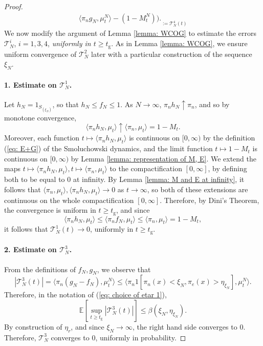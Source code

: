 \documentclass[11pt, notitlepage]{article}
\begin{document}
\begin{proof}
\begin{equation}
\begin{split}
{   \langle \pi_n g_N, \mu^N_t\rangle - (1-M^N_t)).}_{:=\mathcal{T}^4_N(t)}\end{split} \end{equation} We now modify the argument of Lemma \ref{lemma: WCOG} to estimate the errors $\mathcal{T}^i_N$, $i=1,3,4$, \emph{uniformly in $t\ge t_\mathrm{g}$}.  As in Lemma \ref{lemma: WCOG}, we ensure uniform convergence of $\mathcal{T}^2_N$ later with a particular construction of the sequence $\xi_N$. \paragraph{1. Estimate on $\mathcal{T}^1_N$.} Let $h_N=1_{S_{(\xi_N)}}$, so that $h_N \le f_N \le 1$. As $N\rightarrow \infty$, $\pi_n h_N \uparrow \pi_n$, and so by monotone convergence, \begin{equation}
       \langle \pi_n h_N, \mu_t\rangle \uparrow \langle \pi_n, \mu_t\rangle =1-M_t.
   \end{equation} Moreover, each function $t\mapsto \langle \pi_n h_N, \mu_t\rangle$ is continuous on $[0,\infty)$ by the definition (\ref{eq: E+G}) of the Smoluchowski dynamics, and the limit function $t\mapsto 1-M_t$ is continuous on $[0,\infty)$ by Lemma \ref{lemma: representation of M, E}.  We extend the maps $t\mapsto \langle \pi_n h_N, \mu_t\rangle, t\mapsto \langle \pi_n, \mu_t\rangle$ to the compactification $[0,\infty]$, by defining both to be equal to $0$ at infinity. By Lemma \ref{lemma: M and E at infinity}, it follows that $\langle \pi_n, \mu_t\rangle, \langle \pi_n h_N, \mu_t\rangle \rightarrow 0$ as $t\rightarrow \infty$, so both of these extensions are continuous on the whole compactification $[0,\infty].$  Therefore, by Dini's Theorem, the convergence is uniform in $t\geq t_\mathrm{g}$, and since \begin{equation}
       \langle \pi_n h_N, \mu_t\rangle \le \langle \pi_n f_N, \mu_t \rangle \le \langle \pi_n, \mu_t\rangle = 1-M_t, 
   \end{equation} it follows that $\mathcal{T}^1_N(t) \rightarrow 0$, uniformly in $t\geq t_\mathrm{g}$.
   \paragraph{2. Estimate on $\mathcal{T}^3_N$.} From the definitions of $f_N, g_N$, we observe that \begin{equation}
       |\mathcal{T}^3_N(t)|=\langle \pi_n(g_N-f_N), \mu^N_t\rangle \le  \langle \pi_n 1[\pi_n(x)<\xi_N, \pi_e(x)>\eta_{\xi_N}], \mu^N_t\rangle.
   \end{equation} Therefore, in the notation of (\ref{eq: choice of etar 1}), \begin{equation}
       \mathbb{E}\left[\sup_{t\geq t_\mathrm{g}} |\mathcal{T}^3_N(t)|\right] \leq \beta(\xi_N, \eta_{\xi_N}).
   \end{equation} By construction of $\eta_r$, and since $\xi_N \rightarrow \infty$, the right hand side converges to $0$. Therefore, $\mathcal{T}^3_N$ converges to $0$, uniformly in probability.

\end{proof}
\end{document}
